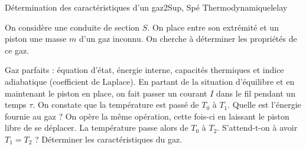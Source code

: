 \begin{exercise}{Détermination des caractéristiques d'un gaz}{2}{Sup, Spé}
{Thermodynamique}{lelay}

On considère une conduite de section $S$. On place entre son extrémité et un piston une masse $m$ d'un gaz inconnu. On cherche à déterminer les propriétés de ce gaz.

\begin{questions}
    \questioncours Gaz parfaits : équation d'état, énergie interne, capacités thermiques et indice adiabatique (coefficient de Laplace).
    \question En partant de la situation d'équilibre et en maintenant le piston en place, on fait passer un courant $I$ dans le fil pendant un temps $\tau$. On constate que la température est passé de $T_0$ à $T_1$. Quelle est l'énergie fournie au gaz ?
    \question On opère la même opération, cette fois-ci en laissant le piston libre de se déplacer. La température passe alors de $T_0$ à $T_2$. S'attend-t-on à avoir $T_1 = T_2$ ?
    \question Déterminer les caractéristiques du gaz.
\end{questions}

\end{exercise}